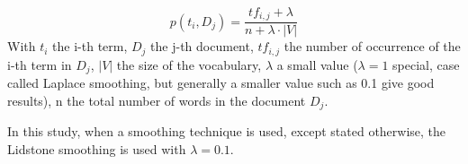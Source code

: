 \begin{definition}
  \label{def:lidstone_smoothing}
  \begin{equation}
    p(t_i, D_j) = \frac{tf_{i,j} + \lambda}{n + \lambda \cdot |V|}
  \end{equation}
  With $t_i$ the i-th term, $D_j$ the j-th document, $tf_{i,j}$ the number of occurrence of the i-th term in $D_j$, $|V|$ the size of the vocabulary, $\lambda$ a small value ($\lambda = 1$ special, case called Laplace smoothing, but generally a smaller value such as 0.1 give good results), n the total number of words in the document $D_j$.
\end{definition}

In this study, when a smoothing technique is used, except stated otherwise, the Lidstone smoothing is used with $\lambda = 0.1$.
